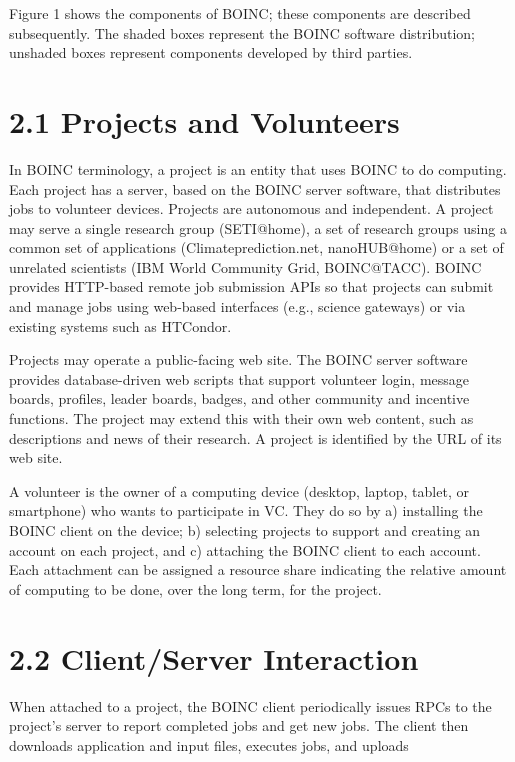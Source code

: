 \documentclass[
]{article}
\begin{document}
Figure 1 shows the components of BOINC; these components are described
subsequently. The shaded boxes represent the BOINC software
distribution; unshaded boxes represent components developed by third
parties.

\section{2.1 Projects and Volunteers}\label{projects-and-volunteers}

In BOINC terminology, a project is an entity that uses BOINC to do
computing. Each project has a server, based on the BOINC server
software, that distributes jobs to volunteer devices. Projects are
autonomous and independent. A project may serve a single research group
(SETI@home), a set of research groups using a common set of applications
(Climateprediction.net, nanoHUB@home) or a set of unrelated scientists
(IBM World Community Grid, BOINC@TACC). BOINC provides HTTP-based remote
job submission APIs so that projects can submit and manage jobs using
web-based interfaces (e.g., science gateways) or via existing systems
such as HTCondor.

Projects may operate a public-facing web site. The BOINC server software
provides database-driven web scripts that support volunteer login,
message boards, profiles, leader boards, badges, and other community and
incentive functions. The project may extend this with their own web
content, such as descriptions and news of their research. A project is
identified by the URL of its web site.

A volunteer is the owner of a computing device (desktop, laptop, tablet,
or smartphone) who wants to participate in VC. They do so by a)
installing the BOINC client on the device; b) selecting projects to
support and creating an account on each project, and c) attaching the
BOINC client to each account. Each attachment can be assigned a resource
share indicating the relative amount of computing to be done, over the
long term, for the project.

\section{2.2 Client/Server Interaction}\label{clientserver-interaction}

When attached to a project, the BOINC client periodically issues RPCs to
the project's server to report completed jobs and get new jobs. The
client then downloads application and input files, executes jobs, and
uploads
\end{document}
